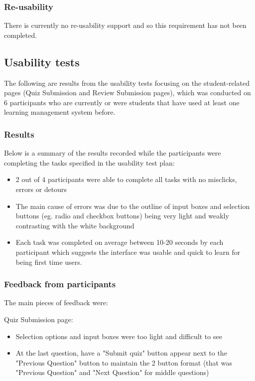 \subsubsection{Re-usability}
There is currently no re-usability support and so this requirement has not been completed.

\subsection{Usability tests}
The following are results from the usability tests focusing on the student-related pages (Quiz Submission and Review Submission pages), which was conducted on 6 participants who are currently or were students that have used at least one learning management system before.

\subsubsection{Results}
Below is a summary of the results recorded while the participants were completing the tasks specified in the usability test plan:

\begin{itemize}
	\item 2 out of 4 participants were able to complete all tasks with no misclicks, errors or detours
	\item The main cause of errors was due to the outline of input boxes and selection buttons (eg. radio and checkbox buttons) being very light and weakly contrasting with the white background
	\item Each task was completed on average between 10-20 seconds by each participant which suggests the interface was usable and quick to learn for being first time users.
\end{itemize}

\subsubsection{Feedback from participants}
The main pieces of feedback were:

Quiz Submission page:
\begin{itemize}
	\item Selection options and input boxes were too light and difficult to see
	\item At the last question, have a "Submit quiz" button appear next to the "Previous Question" button to maintain the 2 button format (that was "Previous Question" and "Next Question" for middle questions)
\end{itemize}


